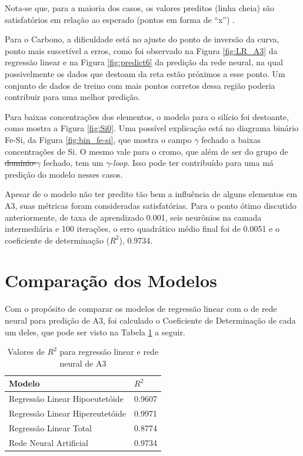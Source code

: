 \documentclass[brazil,tf,epusp]{usp}  %
\providecommand{\DIFadd}[1]{{\protect\color{blue}\uwave{#1}}} %
\providecommand{\DIFdel}[1]{{\protect\color{red}\sout{#1}}}                      %
\providecommand{\DIFaddbegin}{} %
\providecommand{\DIFaddend}{} %
\providecommand{\DIFdelbegin}{} %
\providecommand{\DIFdelend}{} %
\begin{document}
Nota-se que, para a maioria dos casos, os valores preditos (linha cheia) são satisfatórios em relação ao esperado (pontos em forma de ``x'') .

Para o Carbono, a dificuldade está no ajuste do ponto de inversão da curva, ponto mais suscetível a erros, como foi observado na Figura \ref{fig:LR_A3} da regressão linear e na Figura \ref{fig:predict6} da predição da rede neural, na qual possivelmente os dados que destoam da reta estão próximos a esse ponto. Um conjunto de dados de treino com mais pontos corretos dessa região poderia contribuir para uma melhor predição.

Para baixas concentrações dos elementos, o modelo para o silício foi destoante, como mostra a Figura \ref{fig:Si0}. Uma possível explicação está no diagrama binário Fe-Si, da Figura \ref{fig:bin_fe-si}, que mostra o campo $\gamma$ fechado a baixas concentrações de Si. O mesmo vale para o cromo, que além de ser do grupo de \DIFdelbegin \DIFdel{domínio-}\DIFdelend \DIFaddbegin \DIFadd{domínio }\DIFaddend $\gamma$ fechado, tem um $\gamma$-\textit{loop}. Isso pode ter contribuído para uma má predição do modelo nesses casos.

Apesar de o modelo não ter predito tão bem a influência de alguns elementos em A3, suas métricas foram consideradas satisfatórias. Para o ponto ótimo discutido anteriormente, de taxa de aprendizado 0.001, seis neurônios na camada intermediária e 100 iterações, o erro quadrático médio final foi de 0.0051 e o coeficiente de determinação ($R^{2}$), 0.9734.

\section{Comparação dos Modelos}

Com o propósito de comparar os modelos de regressão linear com o de rede neural para predição de A3, foi calculado o Coeficiente de Determinação de cada um deles, que pode ser visto na Tabela \ref{tab:r2_comparacao} a seguir.

\begin{table}
  \caption{Valores de $R^{2}$ para regressão linear e rede neural de A3}

  \begin{tabular}{ll}
  \hline
  Modelo                          & $R^{2}$ \\
  \hline
  Regressão Linear Hipoeutetóide  & 0.9607  \\
  Regressão Linear Hipereutetóide & 0.9971  \\
  Regressão Linear Total          & 0.8774  \\
  Rede Neural Artificial          & 0.9734  \\
  \hline
  \end{tabular}

  \label{tab:r2_comparacao}
\end{table}
\end{document}

